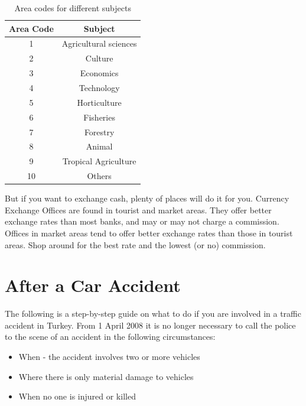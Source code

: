 \begin{table}[!ht]
\caption{Area codes for different subjects}
\centering
\begin{tabular}{|c|c|}
\hline
\textbf{Area Code} & \textbf{Subject}      \\ \hline
1                  & Agricultural sciences \\ \hline
2                  & Culture               \\ \hline
3                  & Economics             \\ \hline
4                  & Technology            \\ \hline
5                  & Horticulture          \\ \hline
6                  & Fisheries             \\ \hline
7                  & Forestry              \\ \hline
8                  & Animal                \\ \hline
9                  & Tropical Agriculture  \\ \hline
10                 & Others                \\ \hline
\end{tabular}
\end{table}

But if you want to exchange cash, plenty of places will do it for you. Currency Exchange Offices  are found in tourist and market areas. They offer better exchange rates than most banks, and may or may not charge a commission. Offices in market areas tend to offer better exchange rates than those in tourist areas. Shop around for the best rate and the lowest (or no) commission.

\section{After a Car Accident}
The following is a step-by-step guide on what to do if you are involved in a traffic accident in Turkey.
From 1 April 2008 it is no longer necessary to call the police to the scene of an accident in the following circumstances:\cite{guo2004learning}

\begin{itemize}
\item When - the accident involves two or more vehicles
\item Where there is only material damage to vehicles
\item When no one is injured or killed
\end{itemize}

